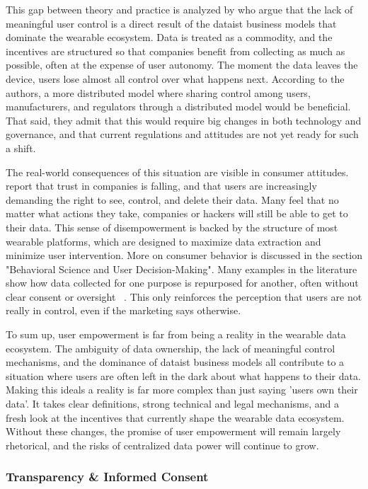 	This gap between theory and practice is analyzed by \cite{Conradie2022} who argue that the lack of meaningful user control is a direct result of the dataist business models that dominate the wearable ecosystem. Data is treated as a commodity, and the incentives are structured so that companies benefit from collecting as much as possible, often at the expense of user autonomy. The moment the data leaves the device, users lose almost all control over what happens next. According to the authors, a more distributed model where sharing control among users, manufacturers, and regulators through a distributed model would be beneficial. That said, they admit that this would require big changes in both technology and governance, and that current regulations and attitudes are not yet ready for such a shift.

	The real-world consequences of this situation are visible in consumer attitudes. \cite{Arbanas2023} report that trust in companies is falling, and that users are increasingly demanding the right to see, control, and delete their data. Many feel that no matter what actions they take, companies or hackers will still be able to get to their data. This sense of disempowerment is backed by the structure of most wearable platforms, which are designed to maximize data extraction and minimize user intervention. More on consumer behavior is discussed in the section "Behavioral Science and User Decision-Making". Many examples in the literature show how data collected for one purpose is repurposed for another, often without clear consent or oversight ~\cite{Sui2023}. This only reinforces the perception that users are not really in control, even if the marketing says otherwise.

	To sum up, user empowerment is far from being a reality in the wearable data ecosystem. The ambiguity of data ownership, the lack of meaningful control mechanisms, and the dominance of dataist business models all contribute to a situation where users are often left in the dark about what happens to their data. Making this ideals a reality is far more complex than just saying 'users own their data'. It takes clear definitions, strong technical and legal mechanisms, and a fresh look at the incentives that currently shape the wearable data ecosystem. Without these changes, the promise of user empowerment will remain largely rhetorical, and the risks of centralized data power will continue to grow.
	\subsubsection{Transparency \& Informed Consent}

